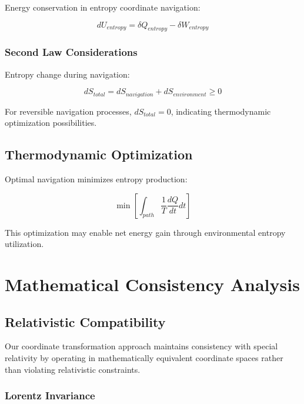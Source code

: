 \documentclass[12pt,a4paper]{article}
\begin{document}
Energy conservation in entropy coordinate navigation:

\begin{equation}
dU_{entropy} = \delta Q_{entropy} - \delta W_{entropy}
\label{eq:first_law_entropy}
\end{equation}

\subsubsection{Second Law Considerations}

Entropy change during navigation:

\begin{equation}
dS_{total} = dS_{navigation} + dS_{environment} \geq 0
\label{eq:second_law_entropy}
\end{equation}

For reversible navigation processes, $dS_{total} = 0$, indicating thermodynamic optimization possibilities.

\subsection{Thermodynamic Optimization}

Optimal navigation minimizes entropy production:

\begin{equation}
\min \left[ \int_{path} \frac{1}{T} \frac{dQ}{dt} dt \right]
\label{eq:optimization}
\end{equation}

This optimization may enable net energy gain through environmental entropy utilization.

\section{Mathematical Consistency Analysis}

\subsection{Relativistic Compatibility}

Our coordinate transformation approach maintains consistency with special relativity by operating in mathematically equivalent coordinate spaces rather than violating relativistic constraints.

\subsubsection{Lorentz Invariance}
\end{document}
